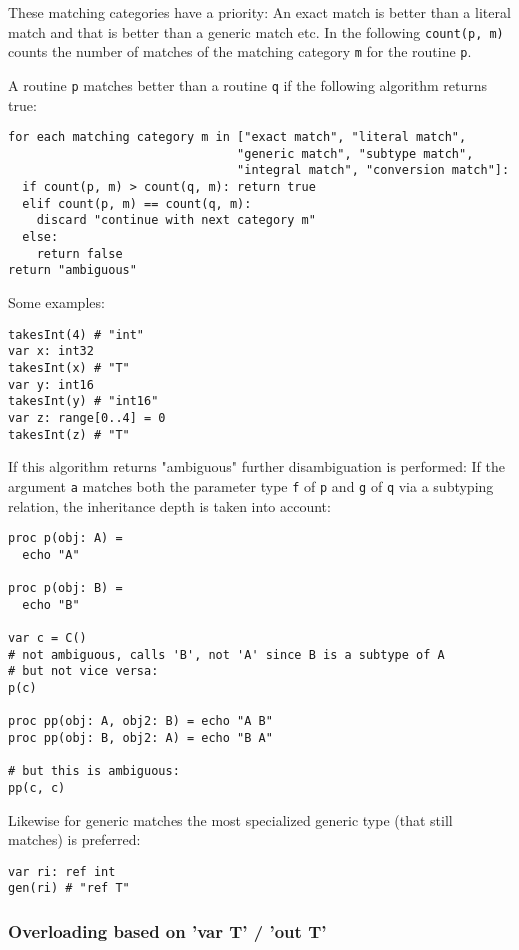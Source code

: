 These matching categories have a priority: An exact match is better than
a literal match and that is better than a generic match etc. In the
following \texttt{count(p,\ m)} counts the number of matches of the
matching category \texttt{m} for the routine \texttt{p}.

A routine \texttt{p} matches better than a routine \texttt{q} if the
following algorithm returns true:

\begin{verbatim}
for each matching category m in ["exact match", "literal match",
                                "generic match", "subtype match",
                                "integral match", "conversion match"]:
  if count(p, m) > count(q, m): return true
  elif count(p, m) == count(q, m):
    discard "continue with next category m"
  else:
    return false
return "ambiguous"
\end{verbatim}

Some examples:

\begin{verbatim}
takesInt(4) # "int"
var x: int32
takesInt(x) # "T"
var y: int16
takesInt(y) # "int16"
var z: range[0..4] = 0
takesInt(z) # "T"
\end{verbatim}

If this algorithm returns "ambiguous" further disambiguation is
performed: If the argument \texttt{a} matches both the parameter type
\texttt{f} of \texttt{p} and \texttt{g} of \texttt{q} via a subtyping
relation, the inheritance depth is taken into account:

\begin{verbatim}
proc p(obj: A) =
  echo "A"

proc p(obj: B) =
  echo "B"

var c = C()
# not ambiguous, calls 'B', not 'A' since B is a subtype of A
# but not vice versa:
p(c)

proc pp(obj: A, obj2: B) = echo "A B"
proc pp(obj: B, obj2: A) = echo "B A"

# but this is ambiguous:
pp(c, c)
\end{verbatim}

Likewise for generic matches the most specialized generic type (that
still matches) is preferred:

\begin{verbatim}
var ri: ref int
gen(ri) # "ref T"
\end{verbatim}

\hypertarget{overloading-based-on-var-t-out-t}{%
\subsubsection{Overloading based on 'var T' / 'out
T'}\label{overloading-based-on-var-t-out-t}}

